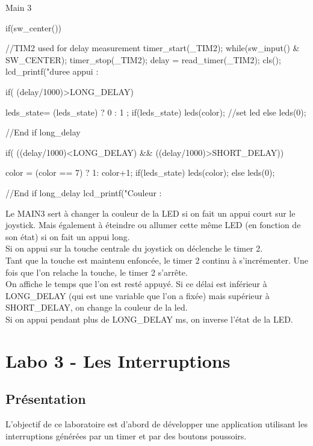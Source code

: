 {\begin{Cpp}{Main 3}
{{        if(sw_center())
        {
            //TIM2 used for delay measurement
            timer_start(_TIM2);
            while(sw_input() & SW_CENTER);
            timer_stop(_TIM2);
            delay = read_timer(_TIM2);
            cls();
            lcd_printf("duree appui : %

            if( (delay/1000)>LONG_DELAY) {
                leds_state= (leds_state) ? 0 : 1 ;
                if(leds_state) {
                    leds(color);
                }
                //set led
                else {
                    leds(0);
                }

            }//End if long_delay

            if( ((delay/1000)<LONG_DELAY) && ((delay/1000)>SHORT_DELAY)) {
                color = (color == 7) ? 1: color+1;
                if(leds_state) {
                    leds(color);
                }
                else {
                    leds(0);
                }
  
            }//End if long_delay
           lcd_printf("Couleur : %
        }
    }        
}
\end{Cpp}

Le MAIN3 sert à changer la couleur de la LED si on fait un appui court sur le joystick. Mais également à éteindre ou allumer cette même LED (en fonction de son état) si on fait un appui long.\\

Si on appui sur la touche centrale du joystick on déclenche le timer 2.\\
Tant que la touche est maintenu enfoncée, le timer 2 continu à s'incrémenter.
Une fois que l'on relache la touche, le timer 2 s'arrête.\\
On affiche le temps que l'on est resté appuyé.
Si ce délai est inférieur à LONG\_DELAY (qui est une variable que l'on a fixée) mais supérieur à SHORT\_DELAY, on change la couleur de la led.\\
Si on appui pendant plus de LONG\_DELAY ms, on inverse l'état de la LED.\part{Labo 3 - Les Interruptions}
\chapter{Présentation}

L'objectif de ce laboratoire est d'abord de développer une application utilisant les interruptions générées par un timer et par des boutons poussoirs. \\

}
